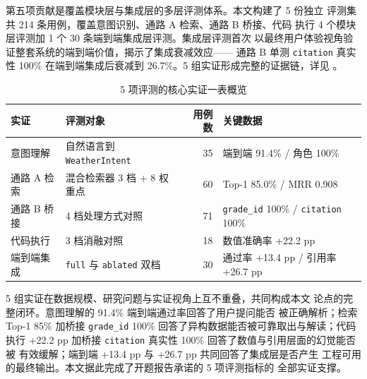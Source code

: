 第五项贡献是覆盖模块层与集成层的多层评测体系。本文构建了 5 份独立
评测集共 214 条用例，覆盖意图识别、通路 A 检索、通路 B 桥接、代码
执行 4 个模块层评测加 1 个 30 条端到端集成层评测。集成层评测首次
以最终用户体验视角验证整套系统的端到端价值，揭示了集成衰减效应——
通路 B 单测 \texttt{citation} 真实性 100\% 在端到端集成后衰减到
26.7\%。5 组实证形成完整的证据链，详见 。

\begin{table}[!htbp]
    \centering
    \caption{5 项评测的核心实证一表概览}
    \label{tab:evidence-summary}
    \song\fontsize{9pt}{12pt}\selectfont
    \renewcommand{\arraystretch}{0.95}
    \begin{tabular}{llrl}
        \toprule
        实证 & 评测对象 & 用例数 & 关键数据 \\
        \midrule
        意图理解 & 自然语言到 \texttt{WeatherIntent} & 35 & 端到端 91.4\% / 角色 100\% \\
        通路 A 检索 & 混合检索器 3 档 + 8 权重点 & 60 & Top-1 85.0\% / MRR 0.908 \\
        通路 B 桥接 & 4 档处理方式对照 & 71 & \texttt{grade\_\bk{}id} 100\% / \texttt{citation} 100\% \\
        代码执行 & 3 档消融对照 & 18 & 数值准确率 +22.2 pp \\
        端到端集成 & \texttt{full} 与 \texttt{ablated} 双档 & 30 & 通过率 +13.4 pp / 引用率 +26.7 pp \\
        \bottomrule
    \end{tabular}
\end{table}

5 组实证在数据规模、研究问题与实证视角上互不重叠，共同构成本文
论点的完整闭环。意图理解的 91.4\% 端到端通过率回答了用户提问能否
被正确解析；检索 Top-1 85\% 加桥接 \texttt{grade\_\bk{}id} 100\%
回答了异构数据能否被可靠取出与解读；代码执行 +22.2 pp 加桥接
\texttt{citation} 真实性 100\% 回答了数值与引用层面的幻觉能否被
有效缓解；端到端 +13.4 pp 与 +26.7 pp 共同回答了集成层是否产生
工程可用的最终输出。本文据此完成了开题报告承诺的 5 项评测指标的
全部实证支撑。

